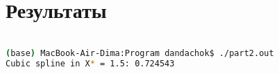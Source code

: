 \section*{Результаты}

\begin{lstlisting}[language=bash]

(base) MacBook-Air-Dima:Program dandachok$ ./part2.out
Cubic spline in X* = 1.5: 0.724543
\end{lstlisting}


\pagebreak